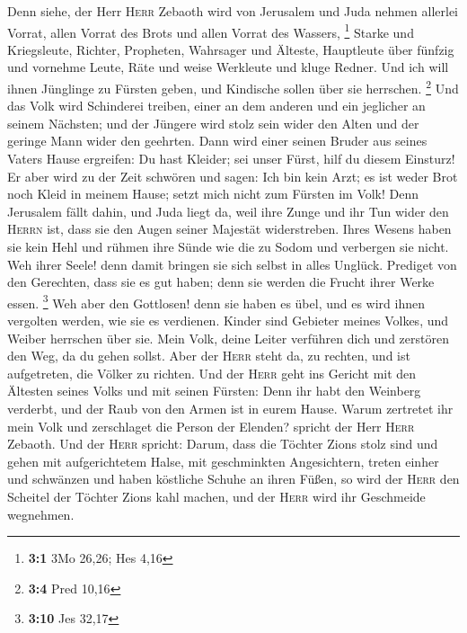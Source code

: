  Denn siehe, der Herr \textsc{Herr} Zebaoth wird von
Jerusalem und Juda nehmen allerlei Vorrat, allen Vorrat des Brots und
allen Vorrat des Wassers, \footnote{\textbf{3:1} 3Mo 26,26; Hes 4,16}
 Starke und Kriegsleute, Richter, Propheten, Wahrsager und
Älteste,  Hauptleute über fünfzig und vornehme Leute, Räte
und weise Werkleute und kluge Redner.  Und ich will ihnen
Jünglinge zu Fürsten geben, und Kindische sollen über sie herrschen.
\footnote{\textbf{3:4} Pred 10,16}  Und das Volk wird
Schinderei treiben, einer an dem anderen und ein jeglicher an seinem
Nächsten; und der Jüngere wird stolz sein wider den Alten und der
geringe Mann wider den geehrten.  Dann wird einer seinen
Bruder aus seines Vaters Hause ergreifen: Du hast Kleider; sei unser
Fürst, hilf du diesem Einsturz!  Er aber wird zu der Zeit
schwören und sagen: Ich bin kein Arzt; es ist weder Brot noch Kleid in
meinem Hause; setzt mich nicht zum Fürsten im Volk!  Denn
Jerusalem fällt dahin, und Juda liegt da, weil ihre Zunge und ihr Tun
wider den \textsc{Herrn} ist, dass sie den Augen seiner Majestät
widerstreben.  Ihres Wesens haben sie kein Hehl und rühmen
ihre Sünde wie die zu Sodom und verbergen sie nicht. Weh ihrer Seele!
denn damit bringen sie sich selbst in alles Unglück. 
Prediget von den Gerechten, dass sie es gut haben; denn sie werden die
Frucht ihrer Werke essen. \footnote{\textbf{3:10} Jes 32,17}
 Weh aber den Gottlosen! denn sie haben es übel, und es
wird ihnen vergolten werden, wie sie es verdienen. 
Kinder sind Gebieter meines Volkes, und Weiber herrschen über sie. Mein
Volk, deine Leiter verführen dich und zerstören den Weg, da du gehen
sollst.  Aber der \textsc{Herr} steht da, zu rechten, und
ist aufgetreten, die Völker zu richten.  Und der
\textsc{Herr} geht ins Gericht mit den Ältesten seines Volks und mit
seinen Fürsten: Denn ihr habt den Weinberg verderbt, und der Raub von
den Armen ist in eurem Hause.  Warum zertretet ihr mein
Volk und zerschlaget die Person der Elenden? spricht der Herr
\textsc{Herr} Zebaoth.  Und der \textsc{Herr} spricht:
Darum, dass die Töchter Zions stolz sind und gehen mit aufgerichtetem
Halse, mit geschminkten Angesichtern, treten einher und schwänzen und
haben köstliche Schuhe an ihren Füßen,  so wird der
\textsc{Herr} den Scheitel der Töchter Zions kahl machen, und der
\textsc{Herr} wird ihr Geschmeide wegnehmen.

